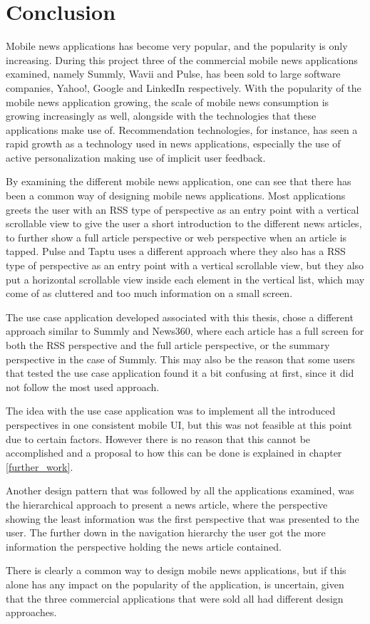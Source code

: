 \chapter{Conclusion}
\label{chapter_conclusion}

Mobile news applications has become very popular, and the popularity is only increasing. During this project three of the commercial mobile news applications examined, namely Summly, Wavii and Pulse, has been sold to large software companies, Yahoo!, Google and LinkedIn respectively. With the popularity of the mobile news application growing, the scale of mobile news consumption is growing increasingly as well, alongside with the technologies that these applications make use of. Recommendation technologies, for instance, has seen a rapid growth as a technology used in news applications, especially the use of active personalization making use of implicit user feedback. 

By examining the different mobile news application, one can see that there has been a common way of designing mobile news applications. Most applications greets the user with an RSS type of perspective as an entry point with a vertical scrollable view to give the user a short introduction to the different news articles, to further show a full article perspective or web perspective when an article is tapped. Pulse and Taptu uses a different approach where they also has a RSS type of perspective as an entry point with a vertical scrollable view, but they also put a horizontal scrollable view inside each element in the vertical list, which may come of as cluttered and too much information on a small screen.

The use case application developed associated with this thesis, chose a different approach similar to Summly and News360, where each article has a full screen for both the RSS perspective and the full article perspective, or the summary perspective in the case of Summly. This may also be the reason that some users that tested the use case application found it a bit confusing at first, since it did not follow the most used approach.

The idea with the use case application was to implement all the introduced perspectives in one consistent mobile UI, but this was not feasible at this point due to certain factors. However there is no reason that this cannot be accomplished and a proposal to how this can be done is explained in chapter \ref{further_work}.

Another design pattern that was followed by all the applications examined, was the hierarchical approach to present a news article, where the perspective showing the least information was the first perspective that was presented to the user. The further down in the navigation hierarchy the user got the more information the perspective holding the news article contained.

There is clearly a common way to design mobile news applications, but if this alone has any impact on the popularity of the application, is uncertain, given that the three commercial applications that were sold all had different design approaches.